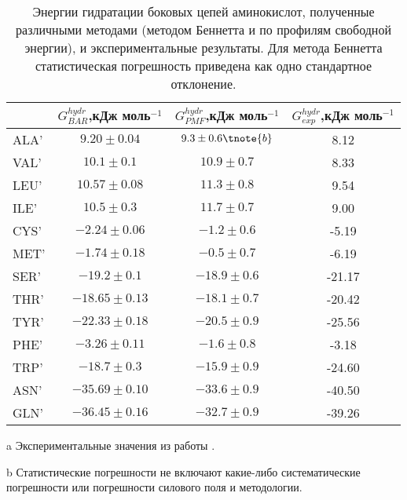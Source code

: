 \begin{table}[p]
\caption{Энергии гидратации боковых цепей аминокислот, полученные различными методами (методом Беннетта и по профилям свободной энергии), и экспериментальные результаты. Для метода Беннетта статистическая погрешность приведена как одно стандартное отклонение.}
	\label{hydr_fe}

\begin{threeparttable}	
	\begin{tabular}{lccc}
	 & $G^{hydr}_{BAR}$,кДж моль$^{-1}$& $G^{hydr}_{PMF}$,кДж моль$^{-1}$& $G^{hydr}_{exp}$,кДж моль$^{-1}$\tnote{a}\\
	\hline

ALA'  &$  9.20\pm0.04 $& $9.3\pm0.6\tnote{b} $&   8.12  \\
VAL'  &$ 10.1 \pm0.1  $&$ 10.9\pm0.7$ &   8.33  \\
LEU'  &$ 10.57\pm0.08 $&$ 11.3\pm0.8$ &   9.54  \\
ILE'  &$ 10.5\pm 0.3  $&$ 11.7\pm0.7$ &   9.00   \\
CYS'  &$ -2.24\pm0.06 $&$ -1.2\pm0.6$&  -5.19  \\
MET'  &$ -1.74\pm0.18 $&$ -0.5\pm0.7$&  -6.19   \\
SER'  &$-19.2\pm 0.1  $&$ -18.9\pm0.6$& -21.17  \\
THR'  &$-18.65\pm0.13 $&$ -18.1\pm0.7$& -20.42   \\
TYR'  &$-22.33\pm0.18 $&$ -20.5\pm0.9$& -25.56   \\
PHE'  &$ -3.26\pm0.11 $&$ -1.6\pm0.8$&  -3.18  \\
TRP'  &$-18.7\pm 0.3  $&$ -15.9\pm0.9$& -24.60   \\
ASN'  &$-35.69\pm0.10 $&$ -33.6\pm0.9$& -40.50   \\
GLN'  &$-36.45\pm0.16 $&$-32.7\pm0.9$& -39.26  \\
\end{tabular}
\begin{tablenotes}	
	\item[a]{Экспериментальные значения из работы \cite{wolfenden_1988}.}
	\item[b]{Статистические погрешности не включают какие-либо систематические погрешности или погрешности силового поля и методологии.}
\end{tablenotes}
\end{threeparttable}

		
	\vspace{3 in}
\end{table}